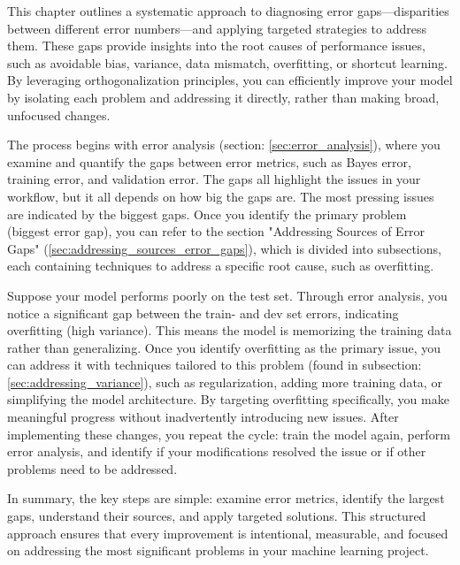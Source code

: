 \documentclass[12pt,openany]{book}
\begin{document}
This chapter outlines a systematic approach to diagnosing error gaps—disparities between different error numbers—and applying targeted strategies to address them. These gaps provide insights into the root causes of performance issues, such as avoidable bias, variance, data mismatch, overfitting, or shortcut learning. By leveraging orthogonalization principles, you can efficiently improve your model by isolating each problem and addressing it directly, rather than making broad, unfocused changes. \newline

The process begins with error analysis (section: \ref{sec:error_analysis}), where you examine and quantify the gaps between error metrics, such as Bayes error, training error, and validation error. The gaps all highlight the issues in your workflow, but it all depends on how big the gaps are. The most pressing issues are indicated by the biggest gaps. Once you identify the primary problem (biggest error gap), you can refer to the section "Addressing Sources of Error Gaps" (\ref{sec:addressing_sources_error_gaps}), which is divided into subsections, each containing techniques to address a specific root cause, such as overfitting. \newline

\begin{examplebox}
Suppose your model performs poorly on the test set. Through error analysis, you notice a significant gap between the train- and dev set errors, indicating overfitting (high variance). This means the model is memorizing the training data rather than generalizing. Once you identify overfitting as the primary issue, you can address it with techniques tailored to this problem (found in subsection: \ref{sec:addressing_variance}), such as regularization, adding more training data, or simplifying the model architecture. By targeting overfitting specifically, you make meaningful progress without inadvertently introducing new issues. After implementing these changes, you repeat the cycle: train the model again, perform error analysis, and identify if your modifications resolved the issue or if other problems need to be addressed.
\end{examplebox}


In summary, the key steps are simple: examine error metrics, identify the largest gaps, understand their sources, and apply targeted solutions. This structured approach ensures that every improvement is intentional, measurable, and focused on addressing the most significant problems in your machine learning project.
\end{document}
